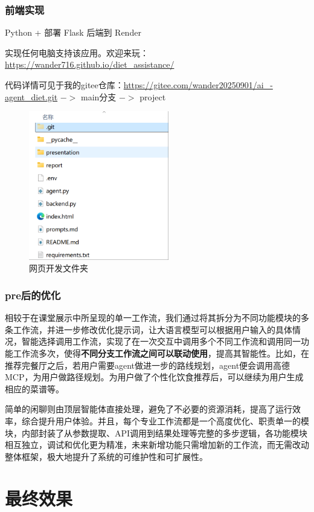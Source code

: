 \documentclass[a4paper,UTF8]{ctexart}
\begin{document}
\subsubsection{前端实现}
Python + 部署 Flask 后端到 Render
\par
实现任何电脑支持该应用。欢迎来玩：\url{https://wander716.github.io/diet_assistance/}
\par
代码详情可见于我的gitee仓库：\url{https://gitee.com/wander20250901/ai_-agent_diet.git} $->$ main分支 $->$ project
\begin{figure}[H]
    \centering
    \includegraphics[width=0.55\linewidth, height=6.5cm]{5-1.png}
    \caption{网页开发文件夹}
    \label{fig:diet_recommend}
\end{figure}

\subsubsection{pre后的优化}
相较于在课堂展示中所呈现的单一工作流，我们通过将其拆分为不同功能模块的多条工作流，并进一步修改优化提示词，让大语言模型可以根据用户输入的具体情况，智能选择调用工作流，实现了在一次交互中调用多个不同工作流和调用同一功能工作流多次，使得{\bfseries 不同分支工作流之间可以联动使用}，提高其智能性。比如，在推荐完餐厅之后，若用户需要agent做进一步的路线规划，agent便会调用高德MCP，为用户做路径规划。为用户做了个性化饮食推荐后，可以继续为用户生成相应的菜谱等。
\par
简单的闲聊则由顶层智能体直接处理，避免了不必要的资源消耗，提高了运行效率，综合提升用户体验。并且，每个专业工作流都是一个高度优化、职责单一的模块，内部封装了从参数提取、API调用到结果处理等完整的多步逻辑，各功能模块相互独立，调试和优化更为精准，未来新增功能只需增加新的工作流，而无需改动整体框架，极大地提升了系统的可维护性和可扩展性。


\section{最终效果}
\end{document}
